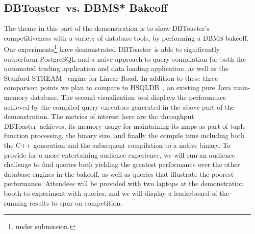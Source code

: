 \documentclass{vldb}
\newcommand{\compiler}{DBToaster}
\begin{document}
\subsection{\compiler\ vs. DBMS* Bakeoff}
The theme in this part of the demonstration is to show \compiler's
competitiveness with a variety of database tools, by performing a DBMS bakeoff.
Our experiments\footnote{under submission.} have demonstrated \compiler\ is able
to significantly outperform PostgreSQL and a naive approach to query compilation
for both the automated trading application and data loading application, as well
as the Stanford STREAM~\cite{motwani-cidr:03} engine for Linear Road. In
addition to these three comparison points we plan to compare to
HSQLDB~\cite{hsqldb-url}, an existing pure Java main-memory database. The second
visualization tool displays the performance achieved by the compiled query
executors generated in the above part of the demonstration. The metrics of
interest here are the throughput \compiler\ achieves, its memory usage for
maintaining its maps as part of tuple function processing, the binary size, and
finally the compile time including both the C++ generation and the subsequent
compilation to a native binary. To provide for a more entertaining audience
experience, we will run an audience challenge to find queries both yielding the
greatest performance over the other database engines in the bakeoff, as well as
queries that illustrate the poorest performance. Attendees will be provided with
two laptops at the demonstration booth to experiment with queries, and we will
display a leaderboard of the running results to spur on competition.




\end{document}
